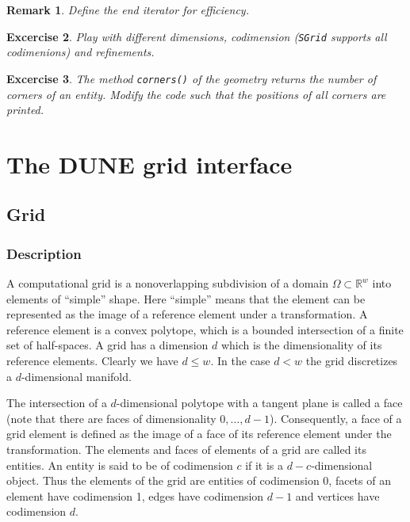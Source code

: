 \documentclass[11pt,a4paper,headinclude,footinclude,DIV14,BCOR8.25mm,titlepage,twoside,openright,normalheadings]{scrreprt}
\newcommand{\R}{\mathbb{R}}
\newtheorem{exc}{Excercise}[chapter]
\newtheorem{rem}[exc]{Remark}
\begin{document}
\begin{rem} Define the end iterator for efficiency. 
\end{rem}

\begin{exc} Play with different dimensions, codimension
  (\lstinline!SGrid! supports all codimenions) and refinements.
\end{exc}

\begin{exc} The method \lstinline!corners()! of the geometry returns
  the number of corners of an entity. Modify the code such that the
  positions of all corners are printed.
\end{exc}

\chapter{The DUNE grid interface}



\section{Grid}

\subsection{Description}

A computational grid is a nonoverlapping subdivision of a domain
$\Omega\subset\R^w$ into elements of ``simple'' shape. Here ``simple''
means that the element can be represented as the image of a reference
element under a transformation. A reference element is a convex
polytope, which is a bounded intersection of a finite set of
half-spaces. A grid has a dimension $d$ which is the dimensionality of
its reference elements. Clearly we have $d\leq w$. In the case $d<w$ the grid
discretizes a $d$-dimensional manifold. 

The intersection of a $d$-dimensional polytope with a
tangent plane is called a face (note that there are faces of
dimensionality $0,\ldots,d-1$). Consequently, a face of a grid element
is defined as the image of a face of its reference element under the
transformation. The elements and faces of elements of a grid are
called its entities. An entity is said to be of codimension $c$ if it
is a $d-c$-dimensional object. Thus the elements of the grid are
entities of codimension 0, facets of an element have codimension 1,
edges have codimension $d-1$ and vertices have codimension $d$.
\end{document}
